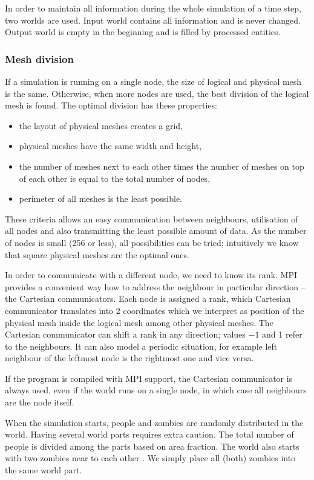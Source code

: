\documentclass[a4paper]{article}
\begin{document}
In order to maintain all information during the whole simulation of a time step, two worlds are used.
Input world contains all information and is never changed.
Output world is empty in the beginning and is filled by processed entities. 

\subsubsection{Mesh division}

If a simulation is running on a single node, the size of logical and physical mesh is the same.
Otherwise, when more nodes are used, the best division of the logical mesh is found.
The optimal division has these properties:
\begin{itemize}
\item the layout of physical meshes creates a grid,
\item physical meshes have the same width and height,
\item the number of meshes next to each other times the number of meshes on top of each other is equal to the total number of nodes,
\item perimeter of all meshes is the least possible.
\end{itemize}

These criteria allows an easy communication between neighbours, utilisation of all nodes and also transmitting the least possible amount of data.
As the number of nodes is small (256 or less), all possibilities can be tried; intuitively we know that square physical meshes are the optimal ones.

In order to communicate with a different node, we need to know its rank.
MPI provides a convenient way how to address the neighbour in particular direction -- the Cartesian communicators.
Each node is assigned a rank, which Cartesian communicator translates into 2 coordinates which we interpret as position of the physical mesh inside the logical mesh among other physical meshes.
The Cartesian communicator can shift a rank in any direction; values $-1$ and 1 refer to the neighbours.
It can also model a periodic situation, for example left neighbour of the leftmost node is the rightmost one and vice versa.

If the program is compiled with MPI support, the Cartesian communicator is always used, even if the world runs on a single node, in which case all neighbours are the node itself.

When the simulation starts, people and zombies are randomly distributed in the world.
Having several world parts requires extra caution.
The total number of people is divided among the parts based on area fraction.
The world also starts with two zombies near to each other \cite{project}.
We simply place all (both) zombies into the same world part.
\end{document}
